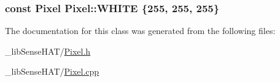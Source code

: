 \subsubsection[{\texorpdfstring{W\+H\+I\+TE}{WHITE}}]{\setlength{\rightskip}{0pt plus 5cm}const {\bf Pixel} Pixel\+::\+W\+H\+I\+TE \{255, 255, 255\}\hspace{0.3cm}{\ttfamily [static]}}\hypertarget{class_pixel_a12c08beec64c8d57bdd9ef3b49244aa3}{}\label{class_pixel_a12c08beec64c8d57bdd9ef3b49244aa3}


The documentation for this class was generated from the following files\+:\begin{DoxyCompactItemize}
\item 
\+\_\+lib\+Sense\+H\+A\+T/\hyperlink{_pixel_8h}{Pixel.\+h}\item 
\+\_\+lib\+Sense\+H\+A\+T/\hyperlink{_pixel_8cpp}{Pixel.\+cpp}\end{DoxyCompactItemize}
